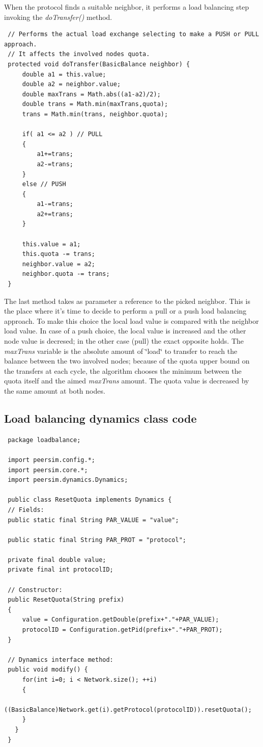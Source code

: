 \documentclass[a4paper,11pt]{article}
\begin{document}
When the protocol finds a suitable neighbor, it performs a load balancing
step invoking the \emph{doTransfer()} method.\\

\footnotesize
\begin{verbatim}
 // Performs the actual load exchange selecting to make a PUSH or PULL approach.
 // It affects the involved nodes quota. 
 protected void doTransfer(BasicBalance neighbor) {
     double a1 = this.value;
     double a2 = neighbor.value;
     double maxTrans = Math.abs((a1-a2)/2);
     double trans = Math.min(maxTrans,quota);
     trans = Math.min(trans, neighbor.quota);
 
     if( a1 <= a2 ) // PULL
     {
         a1+=trans;
         a2-=trans;
     }
     else // PUSH
     {
         a1-=trans;
         a2+=trans;
     }
     
     this.value = a1;
     this.quota -= trans;
     neighbor.value = a2;
     neighbor.quota -= trans; 
 }
\end{verbatim}
\normalsize


The last method takes as parameter a reference to the picked neighbor.
This is the place where it's time to decide to perform a pull or a
push load balancing approach. To make this choice the local load value
is compared with the neighbor load value. In case of a push choice,
the local value is increased and the other node value is decresed;
in the other case (pull) the exact opposite holds. The \emph{maxTrans}
variable is the absolute amount of \char`\"{}load\char`\"{} to transfer
to reach the balance between the two involved nodes; because of the
quota upper bound on the transfers at each cycle, the algorithm chooses
the minimum between the quota itself and the aimed \emph{maxTrans}
amount. The quota value is decreased by the same amount at both nodes.


\subsection{Load balancing dynamics class code}

\footnotesize
\begin{verbatim}
 package loadbalance;
 
 import peersim.config.*;
 import peersim.core.*;
 import peersim.dynamics.Dynamics;
 
 public class ResetQuota implements Dynamics {
 // Fields:
 public static final String PAR_VALUE = "value";
 
 public static final String PAR_PROT = "protocol";
 
 private final double value;
 private final int protocolID;
 
 // Constructor:
 public ResetQuota(String prefix)
 {
     value = Configuration.getDouble(prefix+"."+PAR_VALUE);
     protocolID = Configuration.getPid(prefix+"."+PAR_PROT);
 }
 
 // Dynamics interface method:
 public void modify() {
     for(int i=0; i < Network.size(); ++i)
     {
         ((BasicBalance)Network.get(i).getProtocol(protocolID)).resetQuota();
     }
   }
 }
\end{verbatim}
\normalsize
\end{document}
